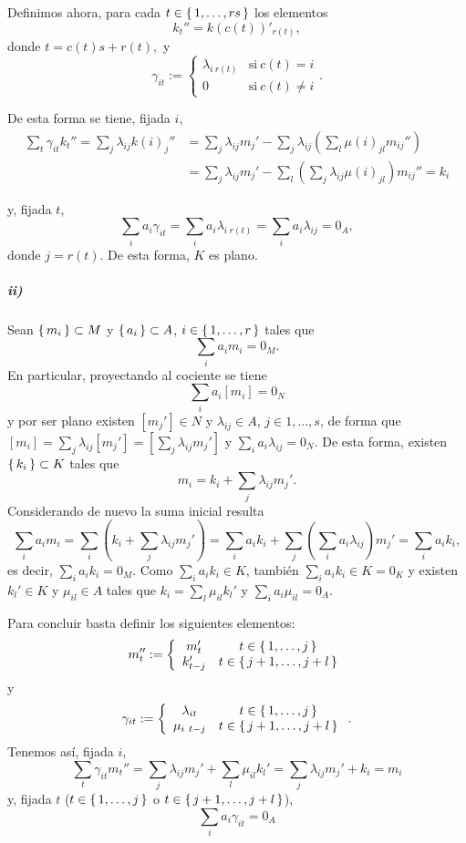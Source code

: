\documentclass[./ejercicios.tex]{subfiles}
\begin{document}
Definimos ahora, para cada $t\in\set{1,\dots,rs}$ los elementos
$$k_t''=k(c(t))'_{r(t)},$$
donde $t=c(t)s+r(t),$ y
$$\gamma_{it}:=\left\{\begin{array}{cc}
\lambda_{i\ r(t)}&\text{si}\ c(t)=i\\
0&\text{si}\ c(t)\neq i
\end{array}\right..$$

De esta forma se tiene, fijada $i$,
\begin{align*}
\sum_t\gamma_{it}k_t''=\sum_j\lambda_{ij}k(i)_{j}''&=\sum_j\lambda_{ij}m_j'-\sum_j\lambda_{ij}\left(\sum_l\mu(i)_{jl}m_{ij}''\right)\\
&=\sum_j\lambda_{ij}m_j'-\sum_l\left(\sum_j\lambda_{ij}\mu(i)_{jl}\right)m_{ij}''=k_i
\end{align*}

y, fijada $t$,
$$\sum_i a_i\gamma_{it}=\sum_i a_i\lambda_{i\ r(t)}=\sum_i a_i\lambda_{ij}=0_A,$$
donde $j=r(t)$. De esta forma, $K$ es plano.

\subparagraph{ii)} Sean $\set{m_i}\subset M$ y $\set{a_i}\subset A$, $i\in\set{1,\dots,r}$ tales que
$$\sum_{i}a_im_i=0_M.$$
En particular, proyectando al cociente se tiene
$$\sum_{i}a_i[m_i]=0_N$$
y por ser plano existen $[m_j']\in N$ y $\lambda_{ij}\in A$, $j\in{1,\dots,s}$, de forma que $[m_i]=\sum_{j}\lambda_{ij}[m_j']=\left[\sum_{j}\lambda_{ij}m_j'\right]$ y $\sum_ia_i\lambda_{ij}=0_N$. De esta forma, existen $\set{k_i}\subset K$ tales que
$$m_i=k_i+\sum_{j}\lambda_{ij}m_j'.$$
Considerando de nuevo la suma inicial resulta
$$\sum_i a_im_i=\sum_i\left(k_i+\sum_{j}\lambda_{ij}m_j'\right)=\sum_i a_ik_i +\sum_j\left(\sum_ia_i\lambda_{ij}\right)m_j'=\sum_i a_ik_i,$$
es decir, $\sum_i a_ik_i=0_M$. Como $\sum_i a_ik_i\in K$, también $\sum_i a_ik_i\in K=0_K$ y existen $k_l'\in K$ y $\mu_{il}\in A$ tales que $k_i=\sum_l\mu_{il}k_l'$ y $\sum_i a_i\mu_{il}=0_A.$

Para concluir basta definir los siguientes elementos:
$$m_t'':=\left\{\begin{array}{cc}
m_{t}'&t\in\set{1,\dots,j}  \\
k_{t-j}'&t\in\set{j+1,\dots,j+l} 
\end{array}\right.$$
y
$$\gamma_{it}:=\left\{\begin{array}{cc}
\lambda_{it}&t\in\set{1,\dots,j}  \\
\mu_{i\ t-j}&t\in\set{j+1,\dots,j+l} 
\end{array}\right..$$
Tenemos así, fijada $i$,
$$\sum_t\gamma_{it}m_t''=\sum_{j}\lambda_{ij}m_j'+\sum_l\mu_{il}k_l'=\sum_{j}\lambda_{ij}m_j'+k_i= m_i$$
y, fijada $t$ ($t\in\set{1,\dots,j}$ o $t\in\set{j+1,\dots,j+l}$),
$$\sum_i a_i\gamma_{it}=0_A$$
\end{document}
